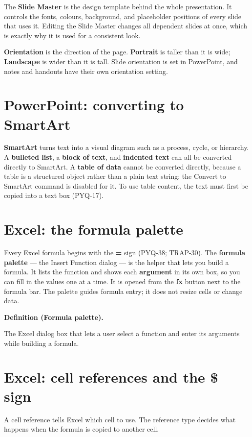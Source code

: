 \documentclass[11pt]{article}
\newenvironment{definitionbox}[1]{%
  \par\noindent\textbf{Definition (#1).}\ \itshape
}{\par\vspace{0.3em}}
\begin{document}
The \textbf{Slide Master} is the design template behind the whole
presentation. It controls the fonts, colours, background, and placeholder
positions of every slide that uses it. Editing the Slide Master changes all
dependent slides at once, which is exactly why it is used for a consistent
look.

\textbf{Orientation} is the direction of the page. \textbf{Portrait} is taller
than it is wide; \textbf{Landscape} is wider than it is tall. Slide
orientation is set in PowerPoint, and notes and handouts have their own
orientation setting.

\section{PowerPoint: converting to SmartArt}
\textbf{SmartArt} turns text into a visual diagram such as a process, cycle,
or hierarchy. A \textbf{bulleted list}, a \textbf{block of text}, and
\textbf{indented text} can all be converted directly to SmartArt. A
\textbf{table of data} cannot be converted directly, because a table is a
structured object rather than a plain text string; the Convert to SmartArt
command is disabled for it. To use table content, the text must first be
copied into a text box (PYQ-17).

\section{Excel: the formula palette}
Every Excel formula begins with the \textbf{=} sign (PYQ-38; TRAP-30). The
\textbf{formula palette} --- the Insert Function dialog --- is the helper that
lets you build a formula. It lists the function and shows each
\textbf{argument} in its own box, so you can fill in the values one at a
time. It is opened from the \textbf{fx} button next to the formula bar. The
palette guides formula entry; it does not resize cells or change data.

\begin{definitionbox}{Formula palette}
The Excel dialog box that lets a user select a function and enter its
arguments while building a formula.
\end{definitionbox}

\section{Excel: cell references and the \$ sign}
A cell reference tells Excel which cell to use. The reference type decides
what happens when the formula is copied to another cell.
\end{document}
